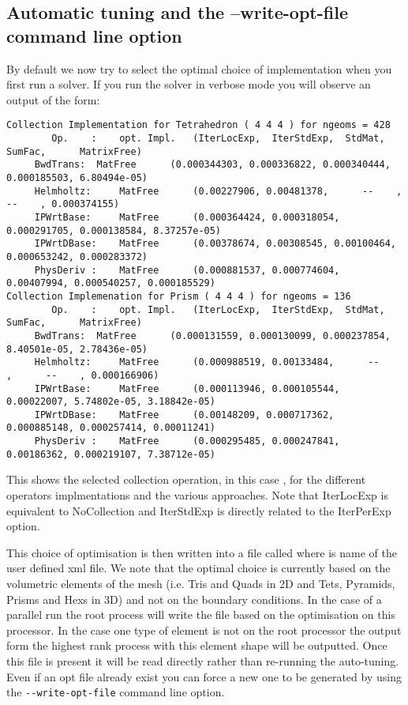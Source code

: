 \subsection{Automatic tuning and the --write-opt-file command line option}
By default we now try to select the optimal choice of implementation
when you first run a solver. If you run the solver in verbose mode you
will observe an output of the form:

\begin{lstlisting}[style=XmlStyle]
Collection Implementation for Tetrahedron ( 4 4 4 ) for ngeoms = 428
	    Op.    :	opt. Impl.	 (IterLocExp,  IterStdExp,  StdMat,     SumFac,      MatrixFree)
	 BwdTrans: 	MatFree   	 (0.000344303, 0.000336822, 0.000340444, 0.000185503, 6.80494e-05)
	 Helmholtz: 	MatFree   	 (0.00227906, 0.00481378,      --    ,      --    , 0.000374155)
	 IPWrtBase: 	MatFree   	 (0.000364424, 0.000318054, 0.000291705, 0.000138584, 8.37257e-05)
	 IPWrtDBase: 	MatFree   	 (0.00378674, 0.00308545, 0.00100464, 0.000653242, 0.000283372)
	 PhysDeriv : 	MatFree   	 (0.000881537, 0.000774604, 0.00407994, 0.000540257, 0.000185529)
Collection Implemenation for Prism ( 4 4 4 ) for ngeoms = 136
	    Op.    :	opt. Impl.	 (IterLocExp,  IterStdExp,  StdMat,     SumFac,      MatrixFree)
	 BwdTrans: 	MatFree   	 (0.000131559, 0.000130099, 0.000237854, 8.40501e-05, 2.78436e-05)
	 Helmholtz: 	MatFree   	 (0.000988519, 0.00133484,      --    ,      --    , 0.000166906)
	 IPWrtBase: 	MatFree   	 (0.000113946, 0.000105544, 0.00022007, 5.74802e-05, 3.18842e-05)
	 IPWrtDBase: 	MatFree   	 (0.00148209, 0.000717362, 0.000885148, 0.000257414, 0.00011241)
	 PhysDeriv : 	MatFree   	 (0.000295485, 0.000247841, 0.00186362, 0.000219107, 7.38712e-05)
\end{lstlisting}


This shows the selected collection operation, in this case
, for the different operators implmentations and the
various approaches. Note that IterLocExp is equivalent to NoCollection
and IterStdExp is directly related to the IterPerExp option.

This choice of optimisation is then written into a file called
 where  is name of the user defined
xml file. We note that the optimal choice is currently based on the
volumetric elements of the mesh (i.e. Tris and Quads in 2D and Tets,
Pyramids, Prisms and Hexs in 3D) and not on the boundary
conditions. In the case of a parallel run the root process will write
the file based on the optimisation on this processor. In the case one
type of element is not on the root processor the output form the
highest rank process with this element shape will be outputted.  Once
this file is present it will be read directly rather than re-running
the auto-tuning. Even if an opt file already exist you can force a new
one to be generated by using the
\lstinline[style=BashInputStyle]{--write-opt-file} command line
option.


